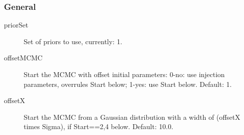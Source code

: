 \documentclass[10pt]{article}
\begin{document}
\subsubsection{General}
\begin{description}                
\item[priorSet] Set of priors to use, currently: 1.
\item[offsetMCMC] Start the MCMC with offset initial parameters: 0-no: use injection parameters, overrules Start below; 1-yes: use Start below.  Default: 1.
\item[offsetX] Start the MCMC from a Gaussian distribution with a width of (offsetX times Sigma), if Start==2,4 below.  Default: 10.0.
\end{description}                





%
  
\end{document}
